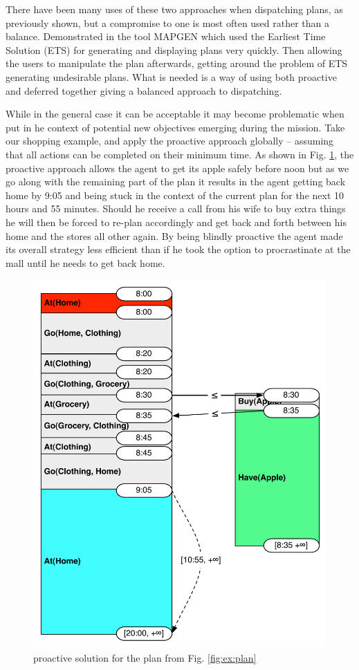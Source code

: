 There
have been many uses of these two approaches when dispatching plans, as
previously shown, but a compromise to one is most often used rather than
a balance. Demonstrated in the tool MAPGEN \cite{bresina03} which used
the Earliest Time Solution (ETS) for generating and displaying plans
very quickly. Then allowing the users to manipulate the plan afterwards,
getting around the problem of ETS generating undesirable plans. What is
needed is a way of using both proactive and deferred together giving a
balanced approach to dispatching.

While in the general case it can be acceptable it
may become problematic when put in he context of potential new
objectives emerging during the mission.  Take our shopping example,
and apply the proactive approach globally -- assuming that all actions
can be completed on their minimum time.  As shown in 
Fig. \ref{fig:ex:proactive}, the proactive approach allows the
agent to get its apple safely before noon but as we go along with the
remaining part of the plan it results in the agent getting back home
by 9:05 and being stuck in the context of the current plan for the
next 10 hours and 55 minutes. Should he receive a call from his wife
to buy extra things he will then be forced to re-plan accordingly and
get back and forth between his home and the stores all other
again. By being blindly proactive the agent made its overall strategy
less efficient than if he took the option to procrastinate at the mall
until he needs to get back home. 


\begin{figure}
  \centering
  \includegraphics[width=0.8\columnwidth]{figs/example_early}
  \caption{proactive solution for the plan from Fig. \ref{fig:ex:plan}}
  \label{fig:ex:proactive}
\end{figure}

